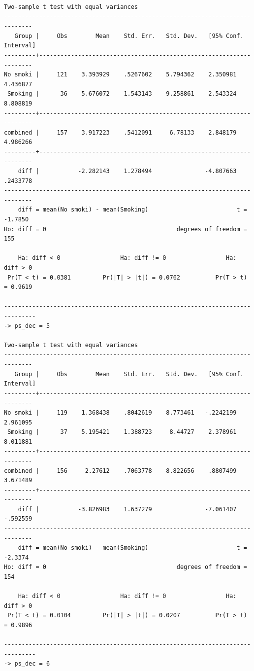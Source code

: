 \documentclass[
  10pt,
]{book}
\begin{document}
\begin{verbatim}
Two-sample t test with equal variances
------------------------------------------------------------------------------
   Group |     Obs        Mean    Std. Err.   Std. Dev.   [95% Conf. Interval]
---------+--------------------------------------------------------------------
No smoki |     121    3.393929    .5267602    5.794362    2.350981    4.436877
 Smoking |      36    5.676072    1.543143    9.258861    2.543324    8.808819
---------+--------------------------------------------------------------------
combined |     157    3.917223    .5412091     6.78133    2.848179    4.986266
---------+--------------------------------------------------------------------
    diff |           -2.282143    1.278494               -4.807663    .2433778
------------------------------------------------------------------------------
    diff = mean(No smoki) - mean(Smoking)                         t =  -1.7850
Ho: diff = 0                                     degrees of freedom =      155

    Ha: diff < 0                 Ha: diff != 0                 Ha: diff > 0
 Pr(T < t) = 0.0381         Pr(|T| > |t|) = 0.0762          Pr(T > t) = 0.9619

-------------------------------------------------------------------------------
-> ps_dec = 5

Two-sample t test with equal variances
------------------------------------------------------------------------------
   Group |     Obs        Mean    Std. Err.   Std. Dev.   [95% Conf. Interval]
---------+--------------------------------------------------------------------
No smoki |     119    1.368438    .8042619    8.773461   -.2242199    2.961095
 Smoking |      37    5.195421    1.388723     8.44727    2.378961    8.011881
---------+--------------------------------------------------------------------
combined |     156     2.27612    .7063778    8.822656    .8807499    3.671489
---------+--------------------------------------------------------------------
    diff |           -3.826983    1.637279               -7.061407    -.592559
------------------------------------------------------------------------------
    diff = mean(No smoki) - mean(Smoking)                         t =  -2.3374
Ho: diff = 0                                     degrees of freedom =      154

    Ha: diff < 0                 Ha: diff != 0                 Ha: diff > 0
 Pr(T < t) = 0.0104         Pr(|T| > |t|) = 0.0207          Pr(T > t) = 0.9896

-------------------------------------------------------------------------------
-> ps_dec = 6


\end{verbatim}
\end{document}
